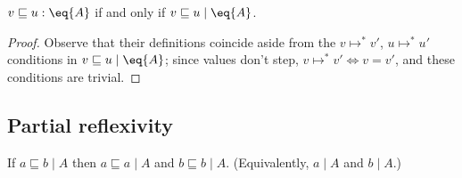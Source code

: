 \documentclass{article}
\newcommand{\ale}{\sqsubseteq}
\newcommand{\step}{\mapsto}
\newcommand{\steps}{\step^*}
\newcommand{\lr}[2]{#2\mathrel{|}#1}
\begin{document}
\begin{theorem}
  \label{thm:agree-ineq}
  $v \ale u : \eq{A}$ if and only if $\lr{\eq{A}}{v \ale u}$.
\end{theorem}

\begin{proof}
  Observe that their definitions coincide aside from the $v \steps v'$, $u
  \steps u'$ conditions in $\lr{\eq{A}}{v \ale u}$; since values don't step, $v
  \steps v' \iff v = v'$, and these conditions are trivial.
\end{proof}

    
    
    
    


\subsection{Partial reflexivity}
\begin{theorem}\label{thm:prefl}
  If $\lr{A}{a \ale b}$ then $\lr{A}{a \ale a}$ and $\lr{A}{b \ale b}$.
  (Equivalently, $\lr{A}{a}$ and $\lr{A}{b}$.)
\end{theorem}
\end{document}
